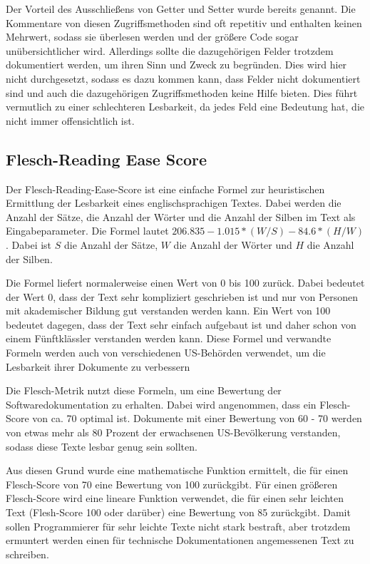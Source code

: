 Der Vorteil des Ausschließens von Getter und Setter wurde bereits genannt. Die Kommentare von diesen Zugriffsmethoden sind oft repetitiv und enthalten keinen Mehrwert, sodass sie überlesen werden und der größere Code sogar unübersichtlicher wird. Allerdings sollte die dazugehörigen Felder trotzdem dokumentiert werden, um ihren Sinn und Zweck zu begründen. Dies wird hier nicht durchgesetzt, sodass es dazu kommen kann, dass Felder nicht dokumentiert sind und auch die dazugehörigen Zugriffsmethoden keine Hilfe bieten. Dies führt vermutlich zu einer schlechteren Lesbarkeit, da jedes Feld eine Bedeutung hat, die nicht immer offensichtlich ist.
\subsection{Flesch-Reading Ease Score}
Der Flesch-Reading-Ease-Score\cite[S. 21]{ThePrinciplesofReadability} ist eine einfache Formel zur heuristischen Ermittlung der Lesbarkeit eines englischsprachigen Textes. Dabei werden die Anzahl der Sätze, die Anzahl der Wörter und die Anzahl der Silben im Text als Eingabeparameter. Die Formel lautet $206.835-1.015*(W/S)-84.6*(H/W)$. Dabei ist $S$ die Anzahl der Sätze, $W$ die Anzahl der Wörter und $H$ die Anzahl der Silben. 

Die Formel liefert normalerweise einen Wert von 0 bis 100 zurück. Dabei bedeutet der Wert 0, dass der Text sehr kompliziert geschrieben ist und nur von Personen mit akademischer Bildung gut verstanden werden kann. Ein Wert von 100 bedeutet dagegen, dass der Text sehr einfach aufgebaut ist und daher schon von einem Fünftklässler verstanden werden kann. Diese Formel und verwandte Formeln werden auch von verschiedenen US-Behörden verwendet, um die Lesbarkeit ihrer Dokumente zu verbessern\cite[S. 72]{AutomaticQualityAssessmentofSourceCodeComments:TheJavadocMiner}

Die Flesch-Metrik nutzt diese Formeln, um eine Bewertung der Softwaredokumentation zu erhalten. Dabei wird angenommen, dass ein Flesch-Score von ca. 70 optimal ist. Dokumente mit einer Bewertung von 60 - 70 werden von etwas mehr als 80 Prozent der erwachsenen US-Bevölkerung verstanden, sodass diese Texte lesbar genug sein sollten.

Aus diesen Grund wurde eine mathematische Funktion ermittelt, die für einen Flesch-Score von 70 eine Bewertung von 100 zurückgibt. Für einen größeren Flesch-Score wird eine lineare Funktion verwendet, die für einen sehr leichten Text (Flesh-Score 100 oder darüber) eine Bewertung von 85 zurückgibt. Damit sollen Programmierer für sehr leichte Texte nicht stark bestraft, aber trotzdem ermuntert werden einen für technische Dokumentationen angemessenen Text zu schreiben.

